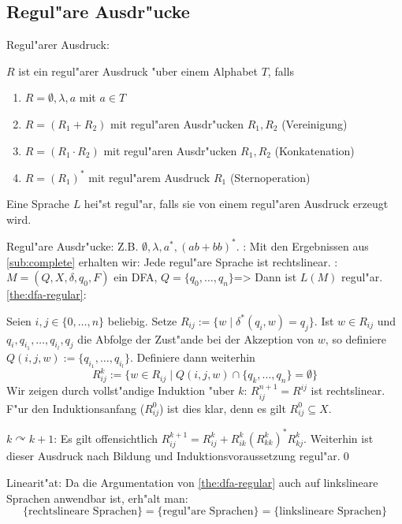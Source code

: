 \subsection{Regul"are Ausdr"ucke}
 Regul"arer Ausdruck:{
  \label{def:regex}
  $R$ ist ein regul"arer Ausdruck "uber einem Alphabet $T$, falls
  \begin{enumerate}
    \item $R = \emptyset, \lambda, a$ mit $a \in T$
    \item $R = (R_1 + R_2)$ mit regul"aren Ausdr"ucken $R_1, R_2$ (Vereinigung)
    \item $R = (R_1 \cdot R_2)$ mit regul"aren Ausdr"ucken $R_1, R_2$ (Konkatenation)
    \item $R = (R_1)^*$ mit regul"arem Ausdruck $R_1$ (Sternoperation)
    \end{enumerate}
  Eine Sprache $L$ hei"st regul"ar, falls sie von einem regul"aren
  Ausdruck erzeugt wird.
  }
\example Regul"are Ausdr"ucke:{
  Z.B. $\emptyset, \lambda, a^*, (ab + bb)^*$.
  }
\remark :{
  Mit den Ergebnissen aus \ref{sub:complete} erhalten wir:
  Jede regul"are Sprache ist rechtslinear.
  }
\theorem: $M=(Q,X,\delta,q_0,F)$ ein DFA, $Q=\{q_0,\ldots,q_n\}$=>{
  \label{the:dfa-regular}
  Dann ist $L(M)$ regul"ar.
  }
\proof \ref{the:dfa-regular}:{
  Seien $i,j\in\{0,\ldots,n\}$ beliebig.
  Setze $R_{ij}:=\{w\mid\delta^*(q_i,w)=q_j\}$. Ist $w\in R_{ij}$
  und $q_i,q_{i_1},\ldots,q_{i_l},q_j$ die Abfolge der Zust"ande
  bei der Akzeption von $w$, so definiere $Q(i,j,w):=\{q_{i_1},\ldots,q_{i_l}\}$.
  Definiere dann weiterhin 
  \[R_{ij}^k:=\{w\in R_{ij}\mid Q(i,j,w)\cap\{q_k,\ldots,q_n\}=\emptyset\}
    \]
  Wir zeigen durch vollst"andige Induktion "uber $k$: $R_{ij}^{n+1}=R^{ij}$
  ist rechtslinear. F"ur den Induktionsanfang ($R_{ij}^0$) ist dies klar, 
  denn es gilt $R_{ij}^0\subseteq X$.
  
  $k \curvearrowright k + 1$: Es gilt offensichtlich
  $R_{ij}^{k+1}=R_{ij}^k+R_{ik}^k(R_{kk}^k)^*R_{kj}^k$. Weiterhin ist
  dieser Ausdruck nach Bildung und Induktionsvoraussetzung regul"ar.\qed
  }
\remark Linearit"at:{
  Da die Argumentation von \ref{the:dfa-regular} auch auf linkslineare
  Sprachen anwendbar ist, erh"alt man:
  \[\{\text{rechtslineare Sprachen}\}=\{\text{regul"are Sprachen}\}=
    \{\text{linkslineare Sprachen}\}
    \]
  }
